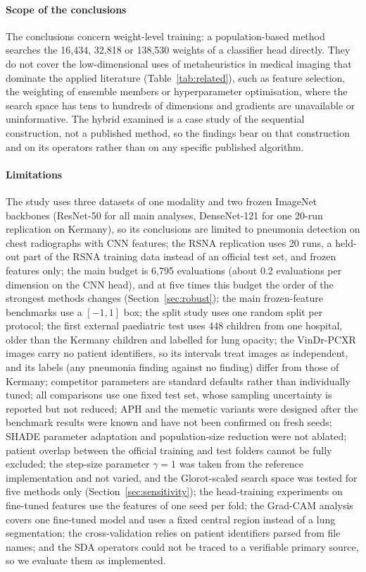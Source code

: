 \documentclass[10pt,letterpaper]{article}
\begin{document}
\paragraph{Scope of the conclusions} The conclusions concern weight-level training: a population-based method searches the 16,434, 32,818 or 138,530 weights of a classifier head directly. They do not cover the low-dimensional uses of metaheuristics in medical imaging that dominate the applied literature (Table~\ref{tab:related}), such as feature selection, the weighting of ensemble members or hyperparameter optimisation, where the search space has tens to hundreds of dimensions and gradients are unavailable or uninformative. The hybrid examined is a case study of the sequential construction, not a published method, so the findings bear on that construction and on its operators rather than on any specific published algorithm.

\paragraph{Limitations} The study uses three datasets of one modality and two frozen ImageNet backbones (ResNet-50 for all main analyses, DenseNet-121 for one 20-run replication on Kermany), so its conclusions are limited to pneumonia detection on chest radiographs with CNN features; the RSNA replication uses 20 runs, a held-out part of the RSNA training data instead of an official test set, and frozen features only; the main budget is 6,795 evaluations (about 0.2 evaluations per dimension on the CNN head), and at five times this budget the order of the strongest methods changes (Section~\ref{sec:robust}); the main frozen-feature benchmarks use a $[-1,1]$ box; the split study uses one random split per protocol; the first external paediatric test uses 448 children from one hospital, older than the Kermany children and labelled for lung opacity; the VinDr-PCXR images carry no patient identifiers, so its intervals treat images as independent, and its labels (any pneumonia finding against no finding) differ from those of Kermany; competitor parameters are standard defaults rather than individually tuned; all comparisons use one fixed test set, whose sampling uncertainty is reported but not reduced; APH and the memetic variants were designed after the benchmark results were known and have not been confirmed on fresh seeds; SHADE parameter adaptation and population-size reduction were not ablated; patient overlap between the official training and test folders cannot be fully excluded; the step-size parameter $\gamma=1$ was taken from the reference implementation and not varied, and the Glorot-scaled search space was tested for five methods only (Section~\ref{sec:sensitivity}); the head-training experiments on fine-tuned features use the features of one seed per fold; the Grad-CAM analysis covers one fine-tuned model and uses a fixed central region instead of a lung segmentation; the cross-validation relies on patient identifiers parsed from file names; and the SDA operators could not be traced to a verifiable primary source, so we evaluate them as implemented.
\end{document}
